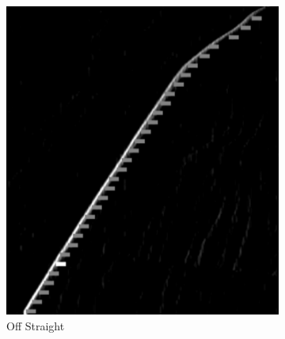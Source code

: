 \begin{figure}[H]
\begin{subfigure}[b]{0.32\textwidth}
                 \includegraphics[width=\textwidth,height=0.2\textheight]{visionpipeline/straightoffsetleft.png}
                 \caption{Off Straight}
                 \label{fig:straight} 
              \end{subfigure}
              \hfill
              \begin{subfigure}[b]{0.32\textwidth}

\end{subfigure}
\end{figure}
